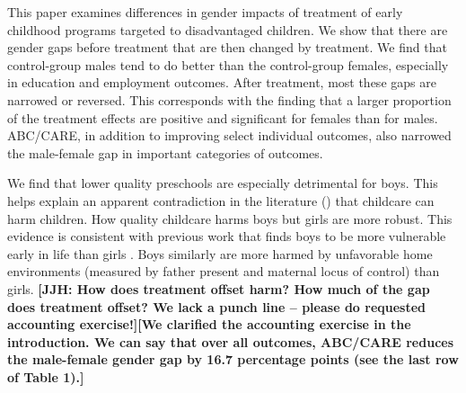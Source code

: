 This paper examines differences in gender impacts of treatment of early childhood programs targeted to disadvantaged children. We show that there are gender gaps before treatment that are then changed by treatment. We find that control-group males tend to do better than the control-group females, especially in education and employment outcomes. After treatment, most these gaps are narrowed or reversed. This corresponds with the finding that a larger proportion of the treatment effects are positive and significant for females than for males. ABC/CARE, in addition to improving select individual outcomes, also narrowed the male-female gap in important categories of outcomes.

We find that lower quality preschools are especially detrimental for boys. This helps explain an apparent contradiction in the literature (\citet{Baker_Gruber_etal_2008_JPE,Baker_Gruber_Milligan_2015_Noncog_Defects,Kottelenberg-Lehrer_2014_Gender-Effects}) that childcare can harm children. How quality childcare harms boys but girls are more robust. This evidence is consistent with previous work that finds boys to be more vulnerable early in life than girls \citep{golding2016psychology}. Boys similarly are more harmed by unfavorable home environments (measured by father present and maternal locus of control) than girls. \textbf{[JJH: How does treatment offset harm? How much of the gap does treatment offset? We lack a punch line -- please do requested accounting exercise!][We clarified the accounting exercise in the introduction. We can say that over all outcomes, ABC/CARE reduces the male-female gender gap by 16.7 percentage points (see the last row of Table 1).]}

